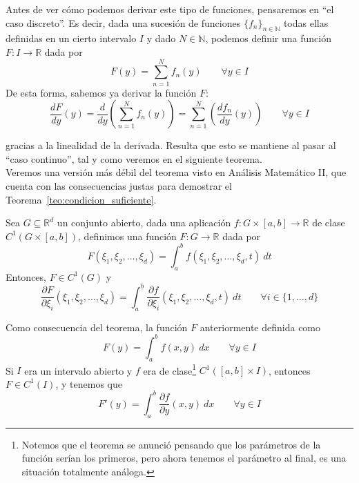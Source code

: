 Antes de ver cómo podemos derivar este tipo de funciones, pensaremos en ``el caso discreto''. Es decir, dada una sucesión de funciones ${\{f_n\}}_{n\in \mathbb{N}}$ todas ellas definidas en un cierto intervalo $I$ y dado $N\in \mathbb{N}$, podemos definir una función $F:I\rightarrow\mathbb{R}$ dada por
\begin{equation*}
    F(y) = \sum_{n=1}^{N} f_n(y) \qquad \forall y\in I
\end{equation*}
De esta forma, sabemos ya derivar la función $F$:
\begin{equation*}
    \dfrac{dF}{dy}(y) = \dfrac{d}{dy}\left(\sum_{n=1}^{N}f_n(y)\right) = \sum_{n=1}^{N}\left(\dfrac{df_n}{dy}(y)\right) \qquad \forall y\in I
\end{equation*}

gracias a la linealidad de la derivada. Resulta que esto se mantiene al pasar al ``caso continuo'', tal y como veremos en el siguiente teorema.\\

Veremos una versión más débil del teorema visto en Análisis Matemático II, que cuenta con las consecuencias justas para demostrar el Teorema~\ref{teo:condicion_suficiente}.
\begin{teo}
    Sea $G\subseteq \mathbb{R}^d$ un conjunto abierto, dada una aplicación $f:G\times [a,b]\rightarrow\mathbb{R}$ de clase $C^1(G\times [a,b])$, definimos una función $F:G\rightarrow\mathbb{R}$ dada por
\begin{equation*}
    F(\xi_1, \xi_2, \ldots, \xi_d) = \int_{a}^{b} f(\xi_1, \xi_2, \ldots, \xi_d, t)~dt
\end{equation*}
Entonces, $F\in C^1(G)$ y 
\begin{equation*}
    \dfrac{\partial F}{\partial \xi_i}(\xi_1, \xi_2, \ldots, \xi_d) = \int_{a}^{b} \dfrac{\partial f}{\partial \xi_i}(\xi_1, \xi_2, \ldots, \xi_d, t)~dt \qquad \forall i \in \{1,\ldots, d\}
\end{equation*}
\end{teo}

\noindent
Como consecuencia del teorema, la función $F$ anteriormente definida como
\begin{equation*}
    F(y) = \int_{a}^{b} f(x,y)~dx \qquad \forall y\in I
\end{equation*}
Si $I$ era un intervalo abierto y $f$ era de clase\footnote{Notemos que el teorema se anunció pensando que los parámetros de la función serían los primeros, pero ahora tenemos el parámetro al final, es una situación totalmente análoga.} $C^1([a,b]\times I)$, entonces $F\in C^1(I)$, y tenemos que 
\begin{equation*}
    F'(y) = \int_{a}^{b} \dfrac{\partial f}{\partial y}(x,y)~dx  \qquad \forall y\in I
\end{equation*}

